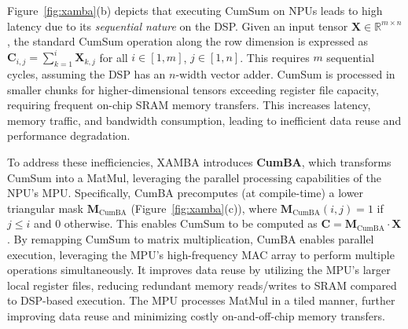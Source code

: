 Figure~\ref{fig:xamba}(b) depicts that executing CumSum on NPUs leads to high latency due to its \textit{sequential nature} on the DSP. Given an input tensor $\mathbf{X} \in \mathbb{R}^{m \times n}$, the standard CumSum operation along the row dimension is expressed as $\mathbf{C}_{i,j} = \sum_{k=1}^{i} \mathbf{X}_{k,j}$ for all $i \in [1, m]$, $j \in [1, n]$. This requires $m$ sequential cycles, assuming the DSP has an $n$-width vector adder. CumSum is processed in smaller chunks for higher-dimensional tensors exceeding register file capacity, requiring frequent on-chip SRAM memory transfers. This increases latency, memory traffic, and bandwidth consumption, leading to inefficient data reuse and performance degradation.

To address these inefficiencies, XAMBA introduces \textbf{CumBA}, which transforms CumSum into a MatMul, leveraging the parallel processing capabilities of the NPU’s MPU. Specifically, CumBA precomputes (at compile-time) a lower triangular mask $\mathbf{M}_{\text{CumBA}}$ (Figure~\ref{fig:xamba}(c)), where $\mathbf{M}_{\text{CumBA}}(i, j) = 1$ if $j \leq i$ and $0$ otherwise. This enables CumSum to be computed as $\mathbf{C} = \mathbf{M}_{\text{CumBA}} \cdot \mathbf{X}$. By remapping CumSum to matrix multiplication, CumBA enables parallel execution, leveraging the MPU’s high-frequency MAC array to perform multiple operations simultaneously. It improves data reuse by utilizing the MPU’s larger local register files, reducing redundant memory reads/writes to SRAM compared to DSP-based execution. The MPU processes MatMul in a tiled manner, further improving data reuse and minimizing costly on-and-off-chip memory transfers. 

